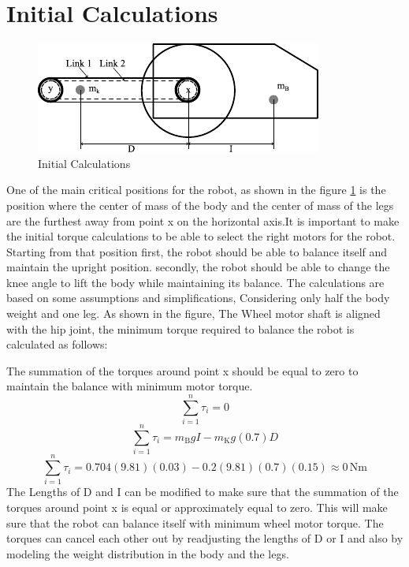\section{Initial Calculations}
\begin{figure}[h]
	\centering
	\includegraphics[width=0.7\linewidth]{Initial Calculations}
	\caption[Initial Calculations]{Initial Calculations}
	\label{fig:initialcalculations}
\end{figure}
One of the main critical positions for the robot, as shown in the figure \ref{fig:initialcalculations} is the position where the center of mass of the body and the center of mass of the legs are the furthest away from point x on the horizontal axis.It is important to make the initial torque calculations to be able to select the right motors for the robot.
Starting from that position first, the robot should be able to balance itself and maintain the upright position.
secondly, the robot should be able to change the knee angle to lift the body while maintaining its balance.
The calculations are based on some assumptions and simplifications, Considering only half the body weight and one leg.
As shown in the figure, The Wheel motor shaft is aligned with the hip joint, the minimum torque required to balance the robot is calculated as follows:

The summation of the torques around point x should be equal to zero to maintain the balance with minimum motor torque.
\begin{equation}
	\sum_{i=1}^{n} \tau_{i}=0
\end{equation}
\begin{equation}
	\sum_{i=1}^{n} \tau_{i}=m_{\mathrm{B}}gI-m_{\mathrm{K}}g(0.7)D
\end{equation}
\begin{equation}
	\sum_{i=1}^{n} \tau_{i}=0.704(9.81)(0.03)-0.2(9.81)(0.7)(0.15)\approx0\,\mathrm{Nm}
\end{equation}
The Lengths of D and I can be modified to make sure that the summation of the torques around point x is equal or approximately equal to zero.
This will make sure that the robot can balance itself with minimum wheel motor torque.
The torques can cancel each other out by readjusting the lengths of D or I and also by modeling the weight distribution in the body and the legs.

